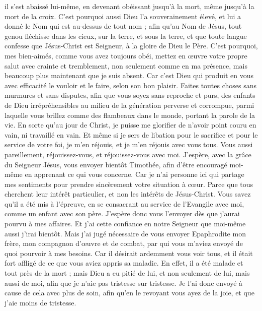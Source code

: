 \begin{multicols}{2}
il s'est abaissé lui-même, en devenant obéissant jusqu’à la mort, même jusqu’à la mort de la croix.
C'est pourquoi aussi Dieu l'a souverainement élevé, et lui a donné le Nom qui est au-dessus de tout nom ;
afin qu'au Nom de Jésus, tout genou fléchisse dans les cieux, sur la terre, et sous la terre,
et que toute langue confesse que Jésus-Christ est Seigneur, à la gloire de Dieu le Père.
C'est pourquoi, mes bien-aimés, comme vous avez toujours obéi, mettez en œuvre votre propre salut avec crainte et tremblement, non seulement comme en ma présence, mais beaucoup plus maintenant que je suis absent.
Car c'est Dieu qui produit en vous avec efficacité le vouloir et le faire, selon son bon plaisir.
Faites toutes choses sans murmures et sans disputes,
afin que vous soyez sans reproche et purs, des enfants de Dieu irrépréhensibles au milieu de la génération perverse et corrompue, parmi laquelle vous brillez comme des flambeaux dans le monde, portant la parole de la vie.
En sorte qu’au jour de Christ, je puisse me glorifier de n'avoir point couru en vain, ni travaillé en vain.
Et même si je sers de libation pour le sacrifice et pour le service de votre foi, je m’en réjouis, et je m'en réjouis avec vous tous.
Vous aussi pareillement, réjouissez-vous, et réjouissez-vous avec moi.
J'espère, avec la grâce du Seigneur Jésus, vous envoyer bientôt Timothée, afin d’être encouragé moi-même en apprenant ce qui vous concerne.
Car je n'ai personne ici qui partage mes sentiments pour prendre sincèrement votre situation à cœur.
Parce que tous cherchent leur intérêt particulier, et non les intérêts de Jésus-Christ.
Vous savez qu’il a été mis à l’épreuve, en se consacrant au service de l’Evangile avec moi, comme un enfant avec son père.
J'espère donc vous l'envoyer dès que j'aurai pourvu à mes affaires.
Et j’ai cette confiance en notre Seigneur que moi-même aussi j’irai bientôt.
Mais j'ai jugé nécessaire de vous envoyer Epaphrodite mon frère, mon compagnon d’œuvre et de combat, par qui vous m’aviez envoyé de quoi pourvoir à mes besoins.
Car il désirait ardemment vous voir tous, et il était fort affligé de ce que vous aviez appris sa maladie.
En effet, il a été malade et tout près de la mort ; mais Dieu a eu pitié de lui, et non seulement de lui, mais aussi de moi, afin que je n'aie pas tristesse sur tristesse.
Je l'ai donc envoyé à cause de cela avec plus de soin, afin qu'en le revoyant vous ayez de la joie, et que j'aie moins de tristesse.

\end{multicols}
